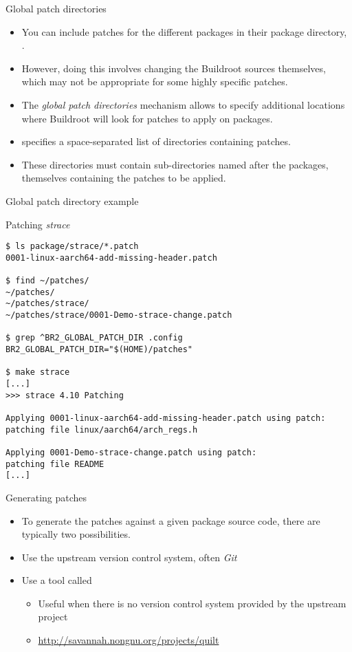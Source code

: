 \begin{frame}{Global patch directories}
  \begin{itemize}
  \item You can include patches for the different packages in their
    package directory, .
  \item However, doing this involves changing the Buildroot sources
    themselves, which may not be appropriate for some highly specific
    patches.
  \item The {\em global patch directories} mechanism allows to specify
    additional locations where Buildroot will look for patches to
    apply on packages.
  \item {} specifies a space-separated list
    of directories containing patches.
  \item These directories must contain sub-directories named after the
    packages, themselves containing the patches to be applied.
  \end{itemize}
\end{frame}

\begin{frame}[fragile]{Global patch directory example}

\begin{block}{Patching {\em strace}}
{\tiny
\begin{verbatim}
$ ls package/strace/*.patch
0001-linux-aarch64-add-missing-header.patch

$ find ~/patches/
~/patches/
~/patches/strace/
~/patches/strace/0001-Demo-strace-change.patch

$ grep ^BR2_GLOBAL_PATCH_DIR .config
BR2_GLOBAL_PATCH_DIR="$(HOME)/patches"

$ make strace
[...]
>>> strace 4.10 Patching

Applying 0001-linux-aarch64-add-missing-header.patch using patch: 
patching file linux/aarch64/arch_regs.h

Applying 0001-Demo-strace-change.patch using patch: 
patching file README
[...]
\end{verbatim}}
\end{block}

\end{frame}

\begin{frame}{Generating patches}
  \begin{itemize}
  \item To generate the patches against a given package source code,
    there are typically two possibilities.
  \item Use the upstream version control system, often {\em Git}
  \item Use a tool called 
    \begin{itemize}
    \item Useful when there is no version control system provided by
      the upstream project
    \item \url{http://savannah.nongnu.org/projects/quilt}
    \end{itemize}
  \end{itemize}
\end{frame}

